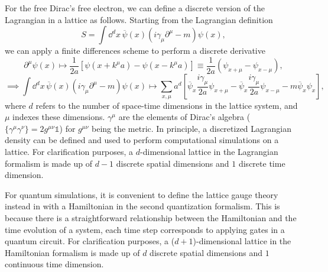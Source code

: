 \documentclass[a4paper]{report}
\begin{document}
\begin{spacing}{1.1}
For the free Dirac's free electron, we can define a discrete version of the Lagrangian in a lattice as follows. Starting from the Lagrangian definition
\begin{equation}
    S = \int \dd^d x\, \overline{\psi}(x) ( i \gamma_{\mu} \partial^{\mu} - m) \psi(x),
\end{equation}
we can apply a finite differences scheme to perform a discrete derivative
\begin{equation}
    \partial^{\mu} \psi(x) \mapsto \frac{1}{2a} \left[\psi(x+k^{\mu} a) - \psi(x-k^{\mu} a) \right] \equiv \frac{1}{2a} \left(\psi_{x+\mu} - \psi_{x-\mu} \right),
\end{equation}
\begin{equation} \label{eq:SQED}
    \implies \int \dd^d x\, \overline{\psi}(x) ( i \gamma_{\mu} \partial^{\mu} - m) \psi(x) \mapsto \sum_{x,\mu} a^d \left[ \overline{\psi}_x \frac{i \gamma_{\mu} }{2a} \psi_{x+\mu} - \overline{\psi}_x \frac{i \gamma_{\mu} }{2a} \psi_{x-\mu} - m \overline{\psi}_x\psi_x \right],
\end{equation}
where $d$ refers to the number of space-time dimensions in the lattice system, and $\mu$ indexes these dimensions. $\gamma^\mu$ are the elements of Dirac's algebra ($\{\gamma^\mu \gamma^\nu \} = 2 g^{\mu\nu} \mathds{1}$) for $g^{\mu\nu}$ being the metric. In principle, a discretized Lagrangian density can be defined and used to perform computational simulations on a lattice. For clarification purposes, a $d$-dimensional lattice in the Lagrangian formalism is made up of $d-1$ discrete spatial dimensions and $1$ discrete time dimension.

For quantum simulations, it is convenient to define the lattice gauge theory instead in with a Hamiltonian in the second quantization formalism. This is because there is a straightforward relationship between the Hamiltonian and the time evolution of a system, each time step corresponds to applying gates in a quantum circuit. For clarification purposes, a ($d+1$)-dimensional lattice in the Hamiltonian formalism is made up of $d$ discrete spatial dimensions and $1$ continuous time dimension.


\end{spacing}
\end{document}
